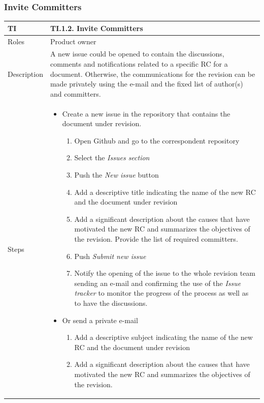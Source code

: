 \documentclass{template/openetcs_article}
\begin{document}
\subsubsection{Invite Committers}

\begin{flushleft}
\tablefirsthead{}
\tablehead{}
\tabletail{}
\tablelasttail{}
\begin{supertabular}{|m{2cm}|m{13cm}|}
\hline
{}
TI & 
TI.1.2. Invite Committers
\\\hline
Roles &
Product owner
\\\hline
Description &
A new issue could be opened to contain the discussions, comments and notifications related to a specific RC for a document. Otherwise, the communications for the revision can be made privately using the e-mail and the fixed list of author(s) and committers. 
\\\hline
Steps &
\begin{itemize}
\item Create a new issue in the repository that contains the document under revision. 
\begin{enumerate}
   \item Open Github and go to the correspondent repository
   \item Select the {\it Issues section}
   \item Push the {\it New issue} button
   \item Add a descriptive title indicating the name of the new RC and the document under revision
   \item Add a significant description about the causes that have motivated the new RC and summarizes the objectives of the revision. Provide the list of required committers.
   	\item Push {\it Submit new issue}
   	\item Notify the opening of the issue to the whole revision team sending an e-mail and confirming the use of the {\it Issue tracker} to monitor the progress of the process as well as to have the discussions.
\end{enumerate}
\item Or send a private e-mail
\begin{enumerate}
   \item Add a descriptive subject indicating the name of the new RC and the document under revision
   \item Add a significant description about the causes that have motivated the new RC and summarizes the objectives of the revision. 
\end{enumerate}
\end{itemize}
\\\hline
\end{supertabular}
\end{flushleft}
\end{document}
